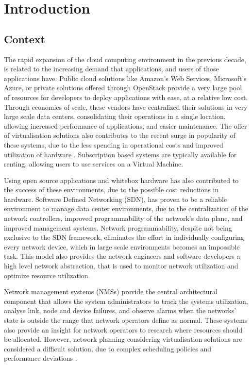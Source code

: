\chapter{Introduction} \label{chap:introduction} 

\section {Context} \label{context}

The rapid expansion of the cloud computing environment in the previous decade, is related to the increasing demand that applications, and users of those 
applications have. Public cloud solutions like Amazon's Web Services, Microsoft's Azure, or private solutions offered through OpenStack provide a very large
pool of resources for developers to deploy applications with ease, at a relative low cost. Through economies of scale, these vendors have centralized their 
solutions in very large scale data centers, consolidating their operations in a single location, allowing increased performance of applications, and easier 
maintenance. The offer of virtualisation solutions also contributes to the recent surge in popularity of these systems, due to the less spending in operational 
costs and improved utilization of hardware \cite{sims_david_carousels_2011}. Subscription based systems are typically available for renting, allowing users to
use services on a Virtual Machine.

\par Using open source applications and whitebox hardware has also contributed to the success of these environments, due to the possible cost reductions in 
hardware. Software Defined Networking (SDN), has proven to be a reliable environment to manage data center environments, due to the centralization of the network
controllers, improved programmability of the network's data plane, and improved management systems. Network programmability, despite not being exclusive to the 
SDN framework, eliminates the effort in individually configuring every network device, which in large scale environments becomes an impossible task. This model
also provides the network engineers and software developers a high level network abstraction, that is used to monitor network utilization and optimize resource
utilization. 

\par Network management systems (NMSs) provide the central architectural component that allows the system administrators to track the systems utilization, 
analyse link, node and device failures, and observe alarms when the networks' state is outside the range that network operators define as normal. These systems
also provide an insight for network operators to research where resources should be allocated. However, network planning considering virtualisation solutions 
are considered a difficult solution, due to complex scheduling policies and performance deviations \cite{sampaio_energy-efficient_2015}. 

